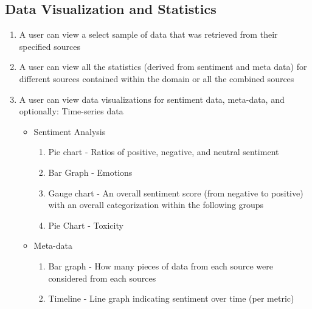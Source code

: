 \documentclass[12pt]{article}
\begin{document}
\subsection{Data Visualization and Statistics}
\begin{enumerate}
  \item A user can view a select sample of data that was retrieved from their specified sources
  \item A user can view all the statistics (derived from sentiment and meta data) for different sources contained within the domain or all the combined sources
  \item A user can view data visualizations for sentiment data, meta-data, and optionally: Time-series data
        \begin{itemize}
          \item Sentiment Analysis
                \begin{enumerate}
                  \item Pie chart - Ratios of positive, negative, and neutral sentiment
                  \item Bar Graph - Emotions
                  \item Gauge chart - An overall sentiment score (from negative to positive) with an
                        overall categorization within the following groups
                  \item Pie Chart - Toxicity
                \end{enumerate}
          \item Meta-data
                \begin{enumerate}
                  \item Bar graph - How many pieces of data from each source were considered from each sources
                  \item Timeline - Line graph indicating sentiment over time (per metric)
                \end{enumerate}
        \end{itemize}
\end{enumerate}
\end{document}
